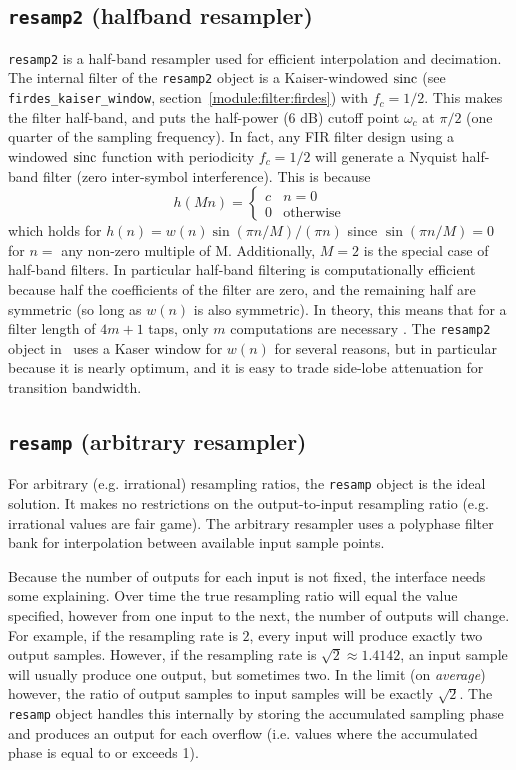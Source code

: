 \subsection{{\tt resamp2} (halfband resampler)}
\label{module:filter:resamp2}
{\tt resamp2} is a half-band resampler used for efficient interpolation and
decimation.
The internal filter of the {\tt resamp2} object is a Kaiser-windowed $\textup{sinc}$
(see {\tt firdes\_kaiser\_window}, section~\ref{module:filter:firdes}) with
$f_c = 1/2$.
This makes the filter half-band, and puts the half-power (6 dB) cutoff point
$\omega_c$ at $\pi/2$ (one quarter of the sampling frequency).
In fact, any FIR filter design using a windowed $\textup{sinc}$ function with
periodicity $f_c=1/2$ will generate a Nyquist half-band filter (zero
inter-symbol interference).
This is because \cite[(4.6.3)]{Vaidyanathan:1993}
%
\begin{equation}
\label{eqn:filter:resamp:h}
    h(Mn) = 
        \begin{cases}
        c & n=0 \\
        0 & \text{otherwise}
        \end{cases}
\end{equation}
%
which holds for $h(n) = w(n) \sin(\pi n/M) / (\pi n)$ since
$\sin(\pi n/M) = 0$ for $n=$ any non-zero multiple of M.
Additionally, $M=2$ is the special case of half-band filters.
In particular half-band filtering is computationally efficient because half
the coefficients of the filter are zero, and the remaining half are symmetric
(so long as $w(n)$ is also symmetric).
In theory, this means that for a filter length of $4m+1$ taps, only $m$
computations are necessary \cite{harris:2004}.
The {\tt resamp2} object in \liquid\ uses a Kaser window for $w(n)$ for
several reasons, but in particular because it is nearly optimum, and it is
easy to trade side-lobe attenuation for transition bandwidth.


% 
%
\subsection{{\tt resamp} (arbitrary resampler)}
\label{module:filter:resamp}
For arbitrary (e.g. irrational) resampling ratios, the {\tt resamp}
object is the ideal solution.
It makes no restrictions on the output-to-input resampling ratio
(e.g. irrational values are fair game).
The arbitrary resampler uses a polyphase filter bank for interpolation
between available input sample points.

Because the number of outputs for each input is not fixed, the interface needs
some explaining.
Over time the true resampling ratio will equal the value specified, however
from one input to the next, the number of outputs will change.
For example, if the resampling rate is $2$, every input will produce exactly
two output samples.
However, if the resampling rate is $\sqrt{2} \approx 1.4142$, an input sample
will usually produce one output, but sometimes two.
In the limit (on {\it average}) however, the ratio of output samples to input
samples will be exactly $\sqrt{2}$.
The {\tt resamp} object handles this internally by storing the accumulated
sampling phase and produces an output for each overflow (i.e. values where the
accumulated phase is equal to or exceeds 1).

